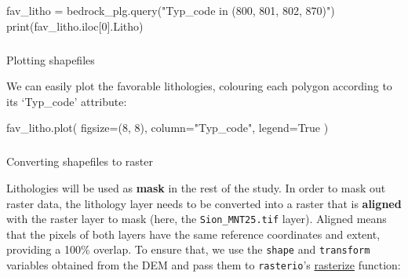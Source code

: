 \documentclass[
  letterpaper,
  DIV=11,
  numbers=noendperiod]{scrartcl}
\makeatletter
\let\oldsubparagraph\subparagraph
\renewcommand{\subparagraph}{
    \@ifstar
      \xxxSubParagraphStar
      \xxxSubParagraphNoStar
  }
\newcommand{\xxxSubParagraphStar}[1]{\oldsubparagraph*{#1}\mbox{}}
\newcommand{\xxxSubParagraphNoStar}[1]{\oldsubparagraph{#1}\mbox{}}
\newenvironment{Shaded}{\begin{snugshade}}{\end{snugshade}}
\newcommand{\BuiltInTok}[1]{\textcolor[rgb]{0.00,0.23,0.31}{#1}}
\newcommand{\DecValTok}[1]{\textcolor[rgb]{0.68,0.00,0.00}{#1}}
\newcommand{\NormalTok}[1]{\textcolor[rgb]{0.00,0.23,0.31}{#1}}
\newcommand{\OperatorTok}[1]{\textcolor[rgb]{0.37,0.37,0.37}{#1}}
\newcommand{\StringTok}[1]{\textcolor[rgb]{0.13,0.47,0.30}{#1}}
\newcommand{\VariableTok}[1]{\textcolor[rgb]{0.07,0.07,0.07}{#1}}
\makeatother
\begin{document}
\begin{tcolorbox}[enhanced jigsaw, arc=.35mm, left=2mm, toprule=.15mm, colbacktitle=quarto-callout-caution-color!10!white, toptitle=1mm, breakable, opacityback=0, rightrule=.15mm, title=\textcolor{quarto-callout-caution-color}{\faFire}\hspace{0.5em}{Solutions}, colframe=quarto-callout-caution-color-frame, bottomrule=.15mm, colback=white, opacitybacktitle=0.6, bottomtitle=1mm, titlerule=0mm, coltitle=black, leftrule=.75mm]

\begin{Shaded}
\begin{Highlighting}[]
\NormalTok{fav\_litho }\OperatorTok{=}\NormalTok{ bedrock\_plg.query(}\StringTok{"Typ\_code in (\textquotesingle{}800\textquotesingle{}, \textquotesingle{}801\textquotesingle{}, \textquotesingle{}802\textquotesingle{}, \textquotesingle{}870\textquotesingle{})"}\NormalTok{)}
\BuiltInTok{print}\NormalTok{(fav\_litho.iloc[}\DecValTok{0}\NormalTok{].Litho)}
\end{Highlighting}
\end{Shaded}

\end{tcolorbox}

\subparagraph{Plotting shapefiles}\label{plotting-shapefiles}

We can easily plot the favorable lithologies, colouring each polygon
according to its `Typ\_code' attribute:

\begin{Shaded}
\begin{Highlighting}[]
\NormalTok{fav\_litho.plot(}
\NormalTok{    figsize}\OperatorTok{=}\NormalTok{(}\DecValTok{8}\NormalTok{, }\DecValTok{8}\NormalTok{),}
\NormalTok{    column}\OperatorTok{=}\StringTok{"Typ\_code"}\NormalTok{,}
\NormalTok{    legend}\OperatorTok{=}\VariableTok{True}
\NormalTok{)}
\end{Highlighting}
\end{Shaded}

\subparagraph{Converting shapefiles to
raster}\label{converting-shapefiles-to-raster}

Lithologies will be used as \textbf{mask} in the rest of the study. In
order to mask out raster data, the lithology layer needs to be converted
into a raster that is \textbf{aligned} with the raster layer to mask
(here, the \texttt{Sion\_MNT25.tif} layer). Aligned means that the
pixels of both layers have the same reference coordinates and extent,
providing a 100\% overlap. To ensure that, we use the \texttt{shape} and
\texttt{transform} variables obtained from the DEM and pass them to
\texttt{rasterio}'s
\href{https://rasterio.readthedocs.io/en/stable/api/rasterio.features.html\#rasterio.features.rasterize}{rasterize}
function:
\end{document}
